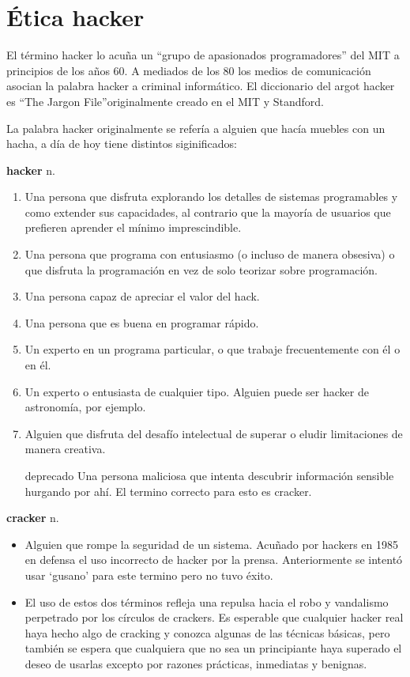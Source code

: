 \section{Ética hacker}

El término hacker lo acuña un ``grupo de apasionados programadores'' del MIT a principios de los años 60. A mediados de los 80 los medios de comunicación asocian la palabra hacker a criminal informático. El diccionario del argot hacker es ``The Jargon File''originalmente creado en el MIT y Standford.

La palabra hacker originalmente se refería a alguien que hacía muebles con un hacha, a día de hoy tiene distintos siginificados:

\textbf{hacker} n.
\begin{enumerate}[label=\textbf{\arabic*.}]
    \item Una persona que disfruta explorando los detalles de sistemas programables y como extender sus capacidades, al contrario que la mayoría de usuarios que prefieren aprender el mínimo imprescindible.
    \item Una persona que programa con entusiasmo (o incluso de manera obsesiva) o que disfruta la programación en vez de solo teorizar sobre programación.
    \item Una persona capaz de apreciar el valor del hack.
    \item Una persona que es buena en programar rápido.
    \item Un experto en un programa particular, o que trabaje frecuentemente con él o en él.
    \item Un experto o entusiasta de cualquier tipo. Alguien puede ser hacker de astronomía, por ejemplo.
    \item Alguien que disfruta del desafío intelectual de superar o eludir limitaciones de manera creativa.
    \item [deprecado] Una persona maliciosa que intenta descubrir información sensible hurgando por ahí. El termino correcto para esto es cracker.
\end{enumerate}

\textbf{cracker} n.
\begin{itemize}
    \item Alguien que rompe la seguridad de un sistema. Acuñado por hackers en 1985 en defensa el uso incorrecto de hacker por la prensa. Anteriormente se intentó usar `gusano' para este termino pero no tuvo éxito.
    \item El uso de estos dos términos refleja una repulsa hacia el robo y vandalismo perpetrado por los círculos de crackers. Es esperable que cualquier hacker real haya hecho algo de cracking y conozca algunas de las técnicas básicas, pero también se espera que cualquiera que no sea un principiante haya superado el deseo de usarlas excepto por razones prácticas, inmediatas y benignas.
\end{itemize}

